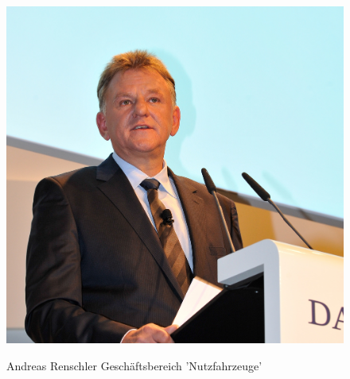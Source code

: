 \documentclass[12pt]{article}
\begin{document}
\begin{figure}[here!]
	\centering
	\begin{minipage}[h]{0.20\textwidth}
		\centering
		\includegraphics[width=1.0\textwidth]{images/AndreasRenschler.jpg}
		\label{fig:vorstandvw6}
	\end{minipage}
	\begin{minipage}[h]{0.10\textwidth}
		\hspace{1cm} 
	\end{minipage}
	\begin{minipage}[h]{0.65\textwidth}
		Andreas Renschler
		Geschäftsbereich 'Nutzfahrzeuge'
	\end{minipage}
\end{figure}
\end{document}
